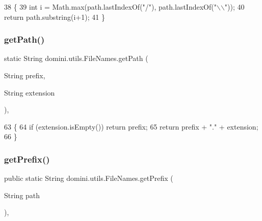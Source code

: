 \begin{DoxyCode}
38                                               \{
39         \textcolor{keywordtype}{int} i = Math.max(path.lastIndexOf(\textcolor{stringliteral}{"/"}), path.lastIndexOf(\textcolor{stringliteral}{"\(\backslash\)\(\backslash\)"}));
40         \textcolor{keywordflow}{return} path.substring(i+1);
41     \}
\end{DoxyCode}
\mbox{\label{classdomini_1_1utils_1_1FileNames_a12c91817013f1485a2318621f3fc1312}} 
\subsubsection{\texorpdfstring{get\+Path()}{getPath()}}
{\footnotesize\ttfamily static String domini.\+utils.\+File\+Names.\+get\+Path (\begin{DoxyParamCaption}\item[{String}]{prefix,  }\item[{String}]{extension }\end{DoxyParamCaption})\hspace{0.3cm}{\ttfamily [inline]}, {\ttfamily [static]}}


\begin{DoxyCode}
63                                                                   \{
64         \textcolor{keywordflow}{if} (extension.isEmpty()) \textcolor{keywordflow}{return} prefix;
65         \textcolor{keywordflow}{return} prefix + \textcolor{stringliteral}{"."} + extension;
66     \}
\end{DoxyCode}
\mbox{\label{classdomini_1_1utils_1_1FileNames_a217ed1d50727e5109fdbd626a3b5bf07}} 
\subsubsection{\texorpdfstring{get\+Prefix()}{getPrefix()}}
{\footnotesize\ttfamily public static String domini.\+utils.\+File\+Names.\+get\+Prefix (\begin{DoxyParamCaption}\item[{String}]{path }\end{DoxyParamCaption})\hspace{0.3cm}{\ttfamily [inline]}, {\ttfamily [static]}}


